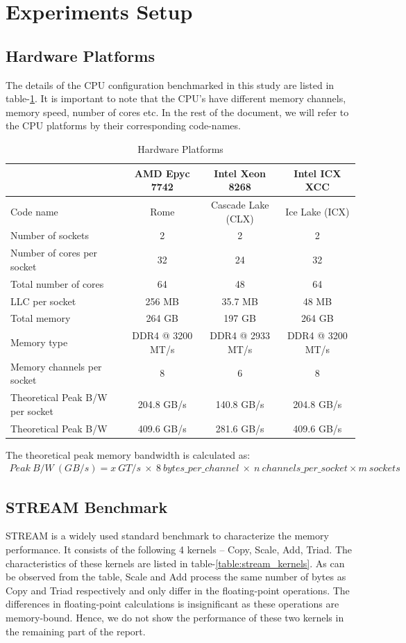 \documentclass{article}
\begin{document}
\section{Experiments Setup}
\subsection{Hardware Platforms}
The details of the CPU configuration benchmarked in this study are listed in table-\ref{table:hw_platforms}. It is important to note that the CPU's have different memory channels, memory speed, number of cores etc. In the rest of the document, we will refer to the CPU platforms by their corresponding code-names.

\begin{table}[h!]
\centering
 \begin{tabular}{|l|c|c|c|} \hline
& AMD Epyc 7742 & Intel Xeon 8268 & Intel ICX XCC \\\hline
Code name & Rome & Cascade Lake (CLX) & Ice Lake (ICX) \\ \hline
Number of sockets & 2 & 2 & 2 \\ \hline
Number of cores per socket & 32 & 24 & 32 \\ \hline
Total number of cores & 64 & 48 & 64 \\ \hline
LLC per socket & 256 MB & 35.7 MB & 48 MB \\ \hline
Total memory & 264 GB & 197 GB & 264 GB \\ \hline
Memory type & DDR4 @ 3200 MT/s & DDR4 @ 2933 MT/s & DDR4 @ 3200 MT/s \\ \hline
Memory channels per socket & 8 & 6 & 8 \\ \hline
Theoretical Peak B/W per socket & 204.8 GB/s & 140.8 GB/s & 204.8 GB/s\\   \hline
Theoretical Peak B/W & 409.6 GB/s & 281.6 GB/s & 409.6 GB/s\\   \hline
\end{tabular}
\caption{Hardware Platforms}
\label{table:hw_platforms}
\end{table}

The theoretical peak memory bandwidth is calculated as: 
\begin{align*}
 Peak\: B/W\: (GB/s) = x\: GT/s\: \times\: 8 \:bytes\_per\_channel\: \times\:  n\: channels\_per\_socket \times m\: sockets
\end{align*}

\subsection{STREAM Benchmark}
STREAM is a widely used standard benchmark to characterize the memory performance. It consists of the following 4 kernels -- Copy, Scale, Add, Triad. The characteristics of these kernels are listed in table-\ref{table:stream_kernels}. As can be observed from the table, Scale and Add process the same number of bytes as Copy and Triad respectively and only differ in the floating-point operations. The differences in floating-point calculations is insignificant as these operations are memory-bound. Hence, we do not show the performance of these two kernels in the remaining part of the report.
\end{document}
